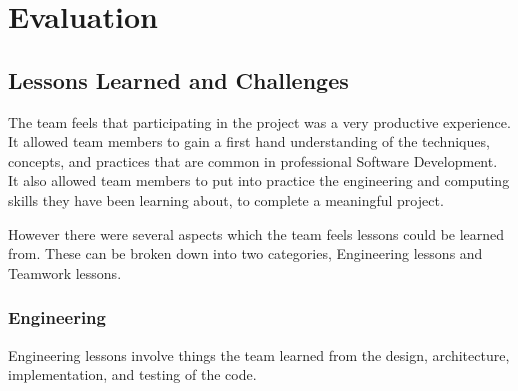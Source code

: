 \documentclass[11pt]{article}
\begin{document}
\pagebreak
\section{Evaluation} 
\subsection{Lessons Learned and Challenges}

The team feels that participating in the project was a very productive experience. It allowed team members to gain a first hand understanding of the techniques, concepts, and practices that are common in professional Software Development. It also allowed team members to put into practice the engineering and computing skills they have been learning about, to complete a meaningful project. 

However there were several aspects which the team feels lessons could be learned from.
These can be broken down into two categories, Engineering lessons and Teamwork lessons.

\subsubsection{Engineering}

Engineering lessons involve things the team learned from the design, architecture, implementation, and testing of the code.
\end{document}
